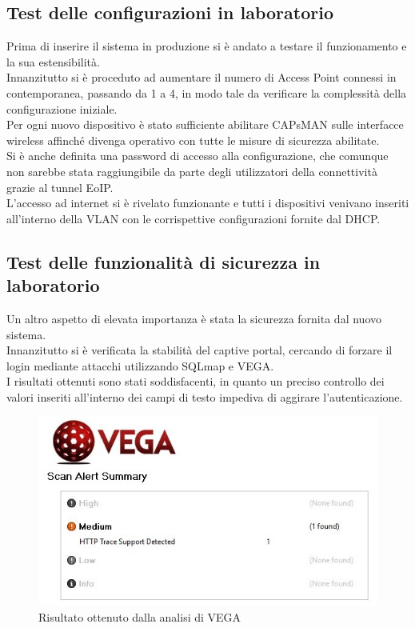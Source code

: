 \documentclass[Realizzazione.tex]{subfiles}
\begin{document}
\subsection{Test delle configurazioni in laboratorio} 
Prima di inserire il sistema in produzione si è andato a testare il funzionamento e la sua estensibilità. \\
Innanzitutto si è proceduto ad aumentare il numero di Access Point connessi in contemporanea, passando da 1 a 4, in modo tale da verificare la complessità della configurazione iniziale. \\
Per ogni nuovo dispositivo è stato sufficiente abilitare CAPsMAN sulle interfacce wireless affinché divenga operativo con tutte le misure di sicurezza abilitate. \\
Si è anche definita una password di accesso alla configurazione, che comunque non sarebbe stata raggiungibile da parte degli utilizzatori della connettività grazie al tunnel EoIP. \\
L'accesso ad internet si è rivelato funzionante e tutti i dispositivi venivano inseriti all'interno della  VLAN con le corrispettive configurazioni fornite dal DHCP.

\subsection{Test delle funzionalità di sicurezza in laboratorio} 
Un altro aspetto di elevata importanza è stata la sicurezza fornita dal nuovo sistema. \\
Innanzitutto si è verificata la stabilità del captive portal, cercando di forzare il login mediante attacchi  utilizzando SQLmap e VEGA. \\
I risultati ottenuti sono stati soddisfacenti, in quanto un preciso controllo dei valori inseriti all'interno dei campi di testo impediva di aggirare l'autenticazione.
\begin{figure}[H]
	\centering
	\includegraphics[width=0.9\linewidth]{"images/vega"}
	\caption{Risultato ottenuto dalla analisi di VEGA}
	\label{fig:Risultato ottenuto dalla analisi di VEGA}
\end{figure}
\end{document}

